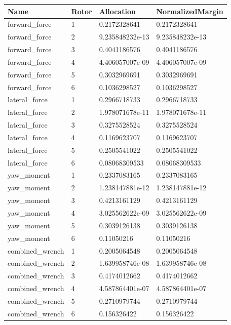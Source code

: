 \begin{tabular}{@{}llll@{}}
\toprule
Name & Rotor & Allocation & NormalizedMargin \\
\midrule
forward\_force & 1 & 0.2172328641 & 0.2172328641 \\
forward\_force & 2 & 9.235848232e-13 & 9.235848232e-13 \\
forward\_force & 3 & 0.4041186576 & 0.4041186576 \\
forward\_force & 4 & 4.406057007e-09 & 4.406057007e-09 \\
forward\_force & 5 & 0.3032969691 & 0.3032969691 \\
forward\_force & 6 & 0.1036298527 & 0.1036298527 \\
lateral\_force & 1 & 0.2966718733 & 0.2966718733 \\
lateral\_force & 2 & 1.978071678e-11 & 1.978071678e-11 \\
lateral\_force & 3 & 0.3275528524 & 0.3275528524 \\
lateral\_force & 4 & 0.1169623707 & 0.1169623707 \\
lateral\_force & 5 & 0.2505541022 & 0.2505541022 \\
lateral\_force & 6 & 0.08068309533 & 0.08068309533 \\
yaw\_moment & 1 & 0.2337083165 & 0.2337083165 \\
yaw\_moment & 2 & 1.238147881e-12 & 1.238147881e-12 \\
yaw\_moment & 3 & 0.4213161129 & 0.4213161129 \\
yaw\_moment & 4 & 3.025562622e-09 & 3.025562622e-09 \\
yaw\_moment & 5 & 0.3039126138 & 0.3039126138 \\
yaw\_moment & 6 & 0.11050216 & 0.11050216 \\
combined\_wrench & 1 & 0.2005064548 & 0.2005064548 \\
combined\_wrench & 2 & 1.639958746e-08 & 1.639958746e-08 \\
combined\_wrench & 3 & 0.4174012662 & 0.4174012662 \\
combined\_wrench & 4 & 4.587864401e-07 & 4.587864401e-07 \\
combined\_wrench & 5 & 0.2710979744 & 0.2710979744 \\
combined\_wrench & 6 & 0.156326422 & 0.156326422 \\
\bottomrule
\end{tabular}
